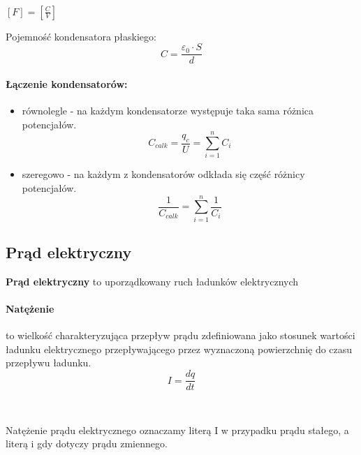 \documentclass{article}
\begin{document}
            \
            
            $[F] = [\frac{C}{V}]$

            Pojemność kondensatora płaskiego:
            \begin{equation}
                C = \frac{\varepsilon_0 \cdotp S}{d}
            \end{equation}

            \paragraph{Łączenie kondensatorów:}
            \begin{itemize}
                \item równolegle - na każdym kondensatorze występuje
                taka sama różnica potencjałów.
                \begin{equation}
                    C_{calk} = \frac{q_c}{U} = \sum\limits_{i = 1}^n C_i
                \end{equation}

                \item szeregowo - na każdym z kondensatorów odkłada
                się część różnicy potencjałów.
                \begin{equation}
                    \frac{1}{C_{calk}} =  \sum\limits_{i = 1}^n \frac{1}{C_i}
                \end{equation}
            \end{itemize}

        \subsection{Prąd elektryczny}
            \textbf{Prąd elektryczny} to uporządkowany ruch ładunków elektrycznych
            \paragraph{Natężenie} to wielkość charakteryzująca przepływ prądu
            zdefiniowana jako stosunek wartości ładunku elektrycznego
            przepływającego przez wyznaczoną powierzchnię do czasu
            przepływu ładunku.
            \begin{equation}
                I = \frac{dq}{dt}
            \end{equation}

            \

            Natężenie prądu elektrycznego oznaczamy literą I w przypadku
            prądu stałego, a literą i gdy dotyczy prądu zmiennego.
\end{document}
